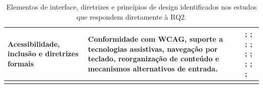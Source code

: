 \begin{longtable}{|p{3.2cm}|p{6cm}|p{5.8cm}|}
Acessibilidade, inclusão e diretrizes formais &
Conformidade com WCAG, suporte a tecnologias assistivas, navegação por teclado, reorganização de conteúdo e mecanismos alternativos de entrada. &
\cite{kouroupetroglou2016methodological}; \cite{breaking_barriers}; \cite{sun2010preliminary}; \cite{dombrovskaia2021guideline}; \cite{wickramathilaka2023addressing}; \cite{chiriboga2025accessible}; \cite{kurniawan2005research}; \cite{lindberg2021towards}; \cite{darvishy2013inclusive}; \cite{mowar2025codea11y} \\ \hline
\caption{Elementos de interface, diretrizes e princípios de design identificados nos estudos que respondem diretamente à RQ2.}
\label{tab:elementosRQ2}
\end{longtable}